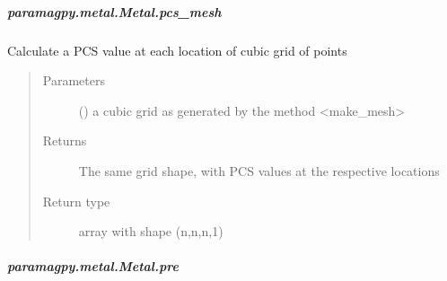 \documentclass[a4paper,10pt,english]{sphinxmanual}
\begin{document}
\begin{fulllineitems}
\begin{fulllineitems}
\begin{fulllineitems}
\end{fulllineitems}



\subparagraph{paramagpy.metal.Metal.pcs\_mesh}
\label{\detokenize{reference/generated/paramagpy.metal.Metal.pcs_mesh:paramagpy-metal-metal-pcs-mesh}}\label{\detokenize{reference/generated/paramagpy.metal.Metal.pcs_mesh::doc}}

\begin{fulllineitems}
\label{\detokenize{reference/generated/paramagpy.metal.Metal.pcs_mesh:paramagpy.metal.Metal.pcs_mesh}}
Calculate a PCS value at each location of cubic grid of points
\begin{quote}\begin{description}
\item[{Parameters}] \leavevmode
{} (\sphinxstyleliteralemphasis{\sphinxupquote{ (}}\sphinxstyleliteralemphasis{\sphinxupquote{,}}\sphinxstyleliteralemphasis{\sphinxupquote{,}}\sphinxstyleliteralemphasis{\sphinxupquote{,}}\sphinxstyleliteralemphasis{\sphinxupquote{)}}) \textendash{} a cubic grid as generated by the method \textless{}make\_mesh\textgreater{}

\item[{Returns}] \leavevmode
{} \textendash{} The same grid shape, with PCS values at the respective locations

\item[{Return type}] \leavevmode
array with shape (n,n,n,1)

\end{description}\end{quote}

\end{fulllineitems}



\subparagraph{paramagpy.metal.Metal.pre}
\label{\detokenize{reference/generated/paramagpy.metal.Metal.pre:paramagpy-metal-metal-pre}}\label{\detokenize{reference/generated/paramagpy.metal.Metal.pre::doc}}


\end{fulllineitems}
\end{fulllineitems}
\end{document}

